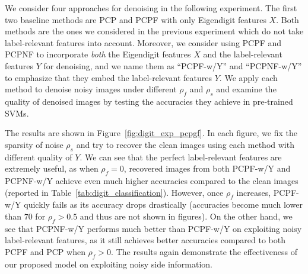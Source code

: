 \documentclass[twoside,11pt]{article}
\begin{document}
We consider four approaches for denoising in the following experiment.
The first two baseline methods are PCP and PCPF with
only Eigendigit features $X$.
Both methods are the ones we considered in the previous experiment
which do not take label-relevant features into account.
Moreover, we consider using PCPF and PCPNF to incorporate
{\it both} the Eigendigit features $X$ and the label-relevant features $Y$ for denoising,
and we name them as ``PCPF-w/Y'' and ``PCPNF-w/Y''
to emphasize that they embed the label-relevant features $Y$.
We apply each method to denoise noisy images under different $\rho_f$ and $\rho_s$
and examine the quality of denoised images
by testing the accuracies they achieve in pre-trained SVMs.

The results are shown in Figure~\ref{fig:digit_exp_pcpgf}.
In each figure, we fix the sparsity of noise
$\rho_s$ and try to recover the clean images using each method with different quality of $Y$.
We can see that the perfect label-relevant features are extremely useful, as
when $\rho_f = 0$, recovered images from both PCPF-w/Y and PCPNF-w/Y
achieve even much higher accuracies compared to the clean images
(reported in Table~\ref{tab:digit_classification}).  However, once $\rho_f$ increases,
PCPF-w/Y quickly fails as its accuracy drops drastically (accuracies
become much lower than $70$ for $\rho_f > 0.5$ and thus are not shown in figures).
On the other hand, we see that PCPNF-w/Y performs
much better than PCPF-w/Y on exploiting noisy label-relevant features, as
it still achieves better accuracies compared to both PCPF and PCP when $\rho_f > 0$.
The results again demonstrate
the effectiveness of our proposed model on exploiting noisy side information.
\end{document}
